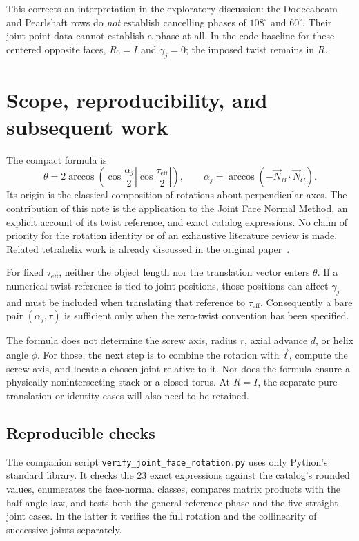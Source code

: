 \documentclass[11pt,letterpaper]{article}
\newcommand{\NB}{\vec N_B}
\newcommand{\NC}{\vec N_C}
\newcommand{\eff}{\tau_{\mathrm{eff}}}
\newcommand{\aj}{\alpha_j}
\newcommand{\gj}{\gamma_j}
\newcommand{\degc}{^{\circ}}
\begin{document}
This corrects an interpretation in the exploratory discussion: the
Dodecabeam and Pearlshaft rows do \emph{not} establish cancelling phases
of $108\degc$ and $60\degc$. Their joint-point data cannot establish a
phase at all. In the code baseline for these centered opposite faces,
$R_0=I$ and $\gj=0$; the imposed twist remains in $R$.

\newpage
\section{Scope, reproducibility, and subsequent work}
The compact formula is
\[
  \boxed{\theta=2\arccos\!\left(
    \cos\frac{\aj}{2}\left|\cos\frac{\eff}{2}\right|\right),
    \qquad \aj=\arccos(-\NB\cdot\NC).}
\]
Its origin is the classical composition of rotations about perpendicular
axes. The contribution of this note is the application to the Joint Face
Normal Method, an explicit account of its twist reference, and exact
catalog expressions. No claim of priority for the rotation identity or of
an exhaustive literature review is made. Related tetrahelix work is already
discussed in the original paper~\cite{sadler2019}.

For fixed $\eff$, neither the object length nor the translation vector enters
$\theta$. If a numerical twist reference is tied to joint positions, those
positions can affect $\gj$ and must be included when translating that
reference to $\eff$. Consequently a bare pair $(\aj,\tau)$ is sufficient
only when the zero-twist convention has been specified.

The formula does not determine the screw axis, radius $r$, axial advance
$d$, or helix angle $\phi$. For those, the next step is to combine the
rotation with $\vec t$, compute the screw axis, and locate a chosen joint
relative to it. Nor does the formula ensure a physically nonintersecting
stack or a closed torus. At $R=I$, the separate pure-translation or identity
cases will also need to be retained.

\subsection*{Reproducible checks}
The companion script \texttt{verify\_joint\_face\_rotation.py} uses only
Python's standard library. It checks the 23 exact expressions against the
catalog's rounded values, enumerates the face-normal classes, compares
matrix products with the half-angle law, and tests both the general
reference phase and the five straight-joint cases. In the latter it verifies
the full rotation and the collinearity of successive joints separately.
\end{document}
